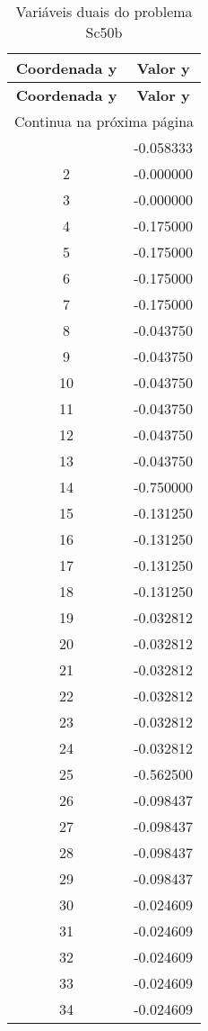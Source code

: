 \documentclass[12pt]{article}
\begin{document}
\begin{longtable}{@{}cc@{}}
\caption{Variáveis duais do problema Sc50b} \\
\toprule
\textbf{Coordenada y} & \textbf{Valor y} \\
\midrule
\endfirsthead

\toprule
\textbf{Coordenada y} & \textbf{Valor y} \\
\midrule
\endhead

\midrule \multicolumn{2}{r}{{Continua na próxima página}} \\ \midrule
\endfoot

\bottomrule
\endlastfoot
1 & -0.058333 \\
2 & -0.000000 \\
3 & -0.000000 \\
4 & -0.175000 \\
5 & -0.175000 \\
6 & -0.175000 \\
7 & -0.175000 \\
8 & -0.043750 \\
9 & -0.043750 \\
10 & -0.043750 \\
11 & -0.043750 \\
12 & -0.043750 \\
13 & -0.043750 \\
14 & -0.750000 \\
15 & -0.131250 \\
16 & -0.131250 \\
17 & -0.131250 \\
18 & -0.131250 \\
19 & -0.032812 \\
20 & -0.032812 \\
21 & -0.032812 \\
22 & -0.032812 \\
23 & -0.032812 \\
24 & -0.032812 \\
25 & -0.562500 \\
26 & -0.098437 \\
27 & -0.098437 \\
28 & -0.098437 \\
29 & -0.098437 \\
30 & -0.024609 \\
31 & -0.024609 \\
32 & -0.024609 \\
33 & -0.024609 \\
34 & -0.024609 \\

\end{longtable}
\end{document}
